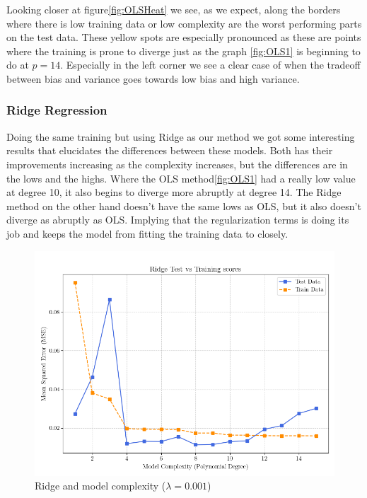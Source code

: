 \documentclass[twocolumn,aps]{revtex4}
\begin{document}
Looking closer at figure\ref{fig:OLSHeat} we see, as we expect, along the borders where there is low training data or low complexity are the worst performing parts on the test data. 
These yellow spots are especially pronounced as these are points where the training is prone to diverge just as the graph \ref{fig:OLS1} is beginning to do at $p=14$.
Especially in the left corner we see a clear case of when the tradeoff between bias and variance goes towards low bias and high variance.


\subsubsection{Ridge Regression}
Doing the same training but using Ridge as our method we got some interesting results that elucidates the differences between these models.
Both has their improvements increasing as the complexity increases, but the differences are in the lows and the highs.
Where the OLS method\ref{fig:OLS1} had a really low value at degree 10, it also begins to diverge more abruptly at degree 14.
The Ridge method on the other hand doesn't have the same lows as OLS, but it also doesn't diverge as abruptly as OLS.
Implying that the regularization terms is doing its job and keeps the model from fitting the training data to closely.


\begin{figure}[h]
    \centering
    \includegraphics[width=.95 \linewidth]{Figures/MSE_RidgeOnly.png}
    \caption{Ridge and model complexity ($\lambda=0.001$)}
    \label{fig:RidgeMse}
\end{figure}
\end{document}
